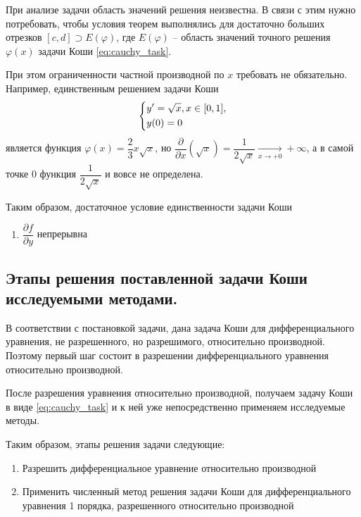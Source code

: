 \documentclass[a4paper, 12pt]{article}
\theoremstyle{mythm}
\begin{document}
	При анализе задачи область значений решения неизвестна. В связи с этим нужно потребовать, чтобы условия теорем выполнялись для достаточно больших отрезков $[c,d] \supset E(\varphi)$, где $E(\varphi)$ -- область значений точного решения $\varphi(x)$ задачи Коши \eqref{eq:cauchy_task}.
	
	При этом ограниченности частной производной по $x$ требовать не обязательно. Например, единственным решением задачи Коши
	\begin{equation}
		\begin{dcases}
			y' = \sqrt{x}, x\in[0,1],\\
			y(0) = 0
		\end{dcases}
	\end{equation}
	является функция $\varphi(x)=\dfrac{2}{3}x\sqrt{x}$, но $\dfrac{\partial}{\partial x} (\sqrt{x})=\dfrac{1}{2\sqrt{x}} \xrightarrow[x\rightarrow+0]{}+\infty$, а в самой точке $0$ функция $\dfrac{1}{2\sqrt{x}}$ и вовсе не определена. 
	
	Таким образом, достаточное условие единственности задачи Коши
	\begin{enumerate}
		\item $\dfrac{\partial f}{\partial y}$ непрерывна
	\end{enumerate}
	
	\subsection{Этапы решения поставленной задачи Коши исследуемыми методами.}
	
	В соответствии с постановкой задачи, дана задача Коши для дифференциального уравнения, не разрешенного, но разрешимого, относительно производной. Поэтому первый шаг состоит в разрешении дифференциального уравнения относительно производной.
	
	После разрешения уравнения относительно производной, получаем задачу Коши в виде \eqref{eq:cauchy_task} и к ней уже непосредственно применяем исследуемые методы. 
	
	Таким образом, этапы решения задачи следующие:
	\begin{enumerate}
		\item Разрешить дифференциальное уравнение относительно производной
		\item Применить численный метод решения задачи Коши для дифференциального уравнения 1 порядка, разрешенного относительно производной
	\end{enumerate}
	
\end{document}
